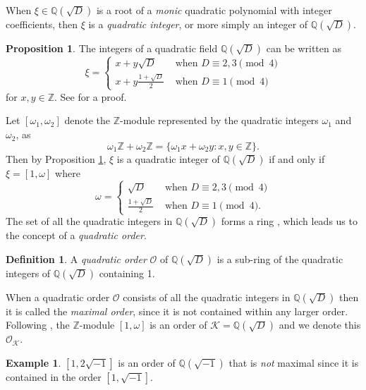 \documentclass{ucalgthes1}
\theoremstyle{definition}
\newtheorem{prop}[thm]{Proposition}
\newtheorem{defn}[thm]{Definition}
\newtheorem{example}[thm]{Example}
\newcommand{\ZZ}{\mathbb{Z}}
\newcommand{\QQ}{\mathbb{Q}}
\newcommand{\KK}{\mathcal{K}}
\newcommand{\OO}{\mathcal{O}}
\begin{document}
When $\xi \in \QQ(\sqrt D)$ is a root of a \emph{monic} quadratic polynomial with integer coefficients, then $\xi$ is a \emph{quadratic integer}, or more simply an integer of $\QQ(\sqrt D)$.

\begin{prop}
\label{prop:quadInts}
\cite[Proposition 13.1.1]{Ireland1990} The integers of a quadratic field $\QQ(\sqrt D)$ can be written as
\begin{equation*}
\xi = \begin{cases}
	x + y \sqrt D & \textrm{ when } D \equiv 2, 3 \pmod 4 \\
	x + y \frac{1 + \sqrt D}{2} & \textrm{ when } D \equiv 1 \pmod 4
	\end{cases}
\end{equation*}
for $x, y \in \ZZ$.  See \cite[p.189]{Ireland1990} for a proof.
\end{prop}

Let $[\omega_1, \omega_2]$ denote the $\ZZ$-module represented by the quadratic integers $\omega_1$ and $\omega_2$, as
\[
	\omega_1 \ZZ + \omega_2 \ZZ = \{ \omega_1 x + \omega_2 y : x, y \in \ZZ \}.
\]
Then by Proposition \ref{prop:quadInts}, $\xi$ is a quadratic integer of $\QQ(\sqrt D)$ if and only if $\xi = [1, \omega]$ where
\[
\omega = \begin{cases}
	\sqrt D & \textrm{ when } D \equiv 2,3 \pmod 4 \\
	\frac{1 + \sqrt D}{2} & \textrm{ when } D \equiv 1 \pmod 4.
\end{cases}
\]
The set of all the quadratic integers in $\QQ(\sqrt D)$ forms a ring \cite[p.47]{Cohn1980}, which leads us to the concept of a \emph{quadratic order}.

\begin{defn}
A \emph{quadratic order} $\OO$ of $\QQ(\sqrt D)$ is a sub-ring of the quadratic integers of $\QQ(\sqrt D)$ containing 1.
\end{defn}

When a quadratic order $\OO$ consists of all the quadratic integers in $\QQ(\sqrt D)$ then it is called the \emph{maximal order}, since it is not contained within any larger order.  Following \mbox{\cite[p.80]{Jacobson2009}}, the $\ZZ$-module $[1, \omega]$ is an order of $\KK = \QQ(\sqrt D)$ and we denote this $\OO_{\KK}$.

\begin{example}
$[1, 2 \sqrt{-1}]$ is an order of $\QQ(\sqrt{-1})$ that is \emph{not} maximal since it is contained in the order $[1, \sqrt{-1}]$.
\end{example}
\end{document}
